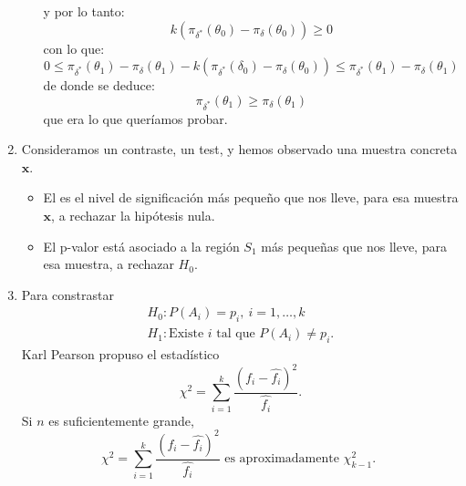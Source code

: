 \begin{enumerate}[label=\color{red}\textbf{\arabic*)}]
\begin{itemize}[label=\textbullet]
\[                                                                                                                                                         \] y por lo tanto: \[
                                                                                                                                                         k(\pi_{\delta^*}(\theta_0)-\pi_\delta(\theta_0))\ge 0
                                                                                                                                                       \] con lo que: \[
                                                                                                                                                       0\le \pi_{\delta^*}(\theta_1)-\pi_\delta(\theta_1)-k(\pi_{\delta^*}(\delta_0)-\pi_\delta(\theta_0))\le \pi_{\delta^*}(\theta_1)-\pi_\delta(\theta_1)
                                                                                                                                                     \] de donde se deduce: \[
                                                                                                                                                     \pi_{\delta^*}(\theta_1)\ge \pi_\delta(\theta_1)
                                                                                                                                                   \] que era lo que queríamos probar.
                                                                                                                                                           \end{itemize}
  \item {}

    Consideramos un contraste, un test, y hemos observado una muestra concreta $\mathbf{x}$.
    \begin{itemize}[label=\textbullet]
          \item El  es el nivel de significación más pequeño que nos lleve, para esa muestra $\mathbf{x}$, a rechazar la hipótesis nula.
                \item El p-valor está asociado a la región $S_1$ más pequeñas que nos lleve, para esa muestra, a rechazar $H_0$.
                \end{itemize}
  \item {}

Para constrastar \[
\begin{array}{l}
    H_0:P(A_i)=p_i,\:i=1,\dots,k\\
    H_1:\text{Existe $i$ tal que  $P(A_i)\neq p_i$.}
\end{array}
\] 
Karl Pearson propuso el estadístico \[
\chi^2=\sum_{i=1}^{k} \dfrac{\left( f_i-\hat{f_i} \right) ^2}{\hat{f_i}}.
\] 
Si $n$ es suficientemente grande,  \[
\chi^2=\sum_{i=1}^{k} \dfrac{\left( f_i-\hat{f_i} \right) ^2}{\hat{f_i}}\text{ es aproximadamente $\chi_{k-1}^2$. }
\] \end{enumerate}
